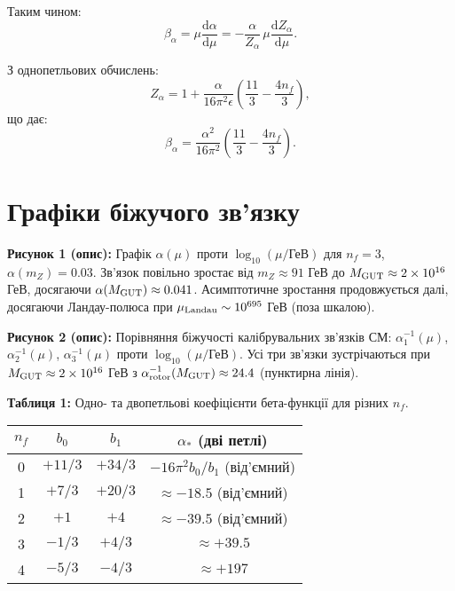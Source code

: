 \documentclass[11pt,a4paper]{article}
\numberwithin{equation}{section}
\theoremstyle{plain}
\theoremstyle{definition}
\theoremstyle{remark}
\newcommand{\dd}{\mathrm{d}}
\begin{document}
Таким чином:
\begin{equation}
\beta_\alpha = \mu\frac{\dd\alpha}{\dd\mu} = -\frac{\alpha}{Z_\alpha}\,\mu\frac{\dd Z_\alpha}{\dd\mu}.
\label{eq:beta-from-Z}
\end{equation}

З однопетльових обчислень:
\begin{equation}
Z_\alpha = 1 + \frac{\alpha}{16\pi^2\epsilon}\left(\frac{11}{3}-\frac{4n_f}{3}\right),
\label{eq:Z-alpha-1loop}
\end{equation}
що дає:
\begin{equation}
\beta_\alpha = \frac{\alpha^2}{16\pi^2}\left(\frac{11}{3}-\frac{4n_f}{3}\right).
\label{eq:beta-final}
\end{equation}

\section{Графіки біжучого зв'язку}\label{app:plots}

\textbf{Рисунок 1 (опис):} Графік $\alpha(\mu)$ проти $\log_{10}(\mu/\text{ГеВ})$ для $n_f=3$, $\alpha(m_Z)=0{.}03$. Зв'язок повільно зростає від $m_Z\approx 91$ ГеВ до $M_{\rm GUT}\approx 2\times 10^{16}$ ГеВ, досягаючи $\alpha(M_{\rm GUT})\approx 0{.}041$. Асимптотичне зростання продовжується далі, досягаючи Ландау-полюса при $\mu_{\rm Landau}\sim 10^{695}$ ГеВ (поза шкалою).

\textbf{Рисунок 2 (опис):} Порівняння біжучості калібрувальних зв'язків СМ: $\alpha_1^{-1}(\mu)$, $\alpha_2^{-1}(\mu)$, $\alpha_3^{-1}(\mu)$ проти $\log_{10}(\mu/\text{ГеВ})$. Усі три зв'язки зустрічаються при $M_{\rm GUT}\approx 2\times 10^{16}$ ГеВ з $\alpha_{\rm rotor}^{-1}(M_{\rm GUT})\approx 24{.}4$ (пунктирна лінія).

\textbf{Таблиця 1:} Одно- та двопетльові коефіцієнти бета-функції для різних $n_f$.

\begin{center}
\begin{tabular}{cccc}
\toprule
$n_f$ & $b_0$ & $b_1$ & $\alpha_*$ (дві петлі) \\
\midrule
0 & $+11/3$ & $+34/3$ & $-16\pi^2 b_0/b_1$ (від'ємний) \\
1 & $+7/3$ & $+20/3$ & $\approx -18{.}5$ (від'ємний) \\
2 & $+1$ & $+4$ & $\approx -39{.}5$ (від'ємний) \\
3 & $-1/3$ & $+4/3$ & $\approx +39{.}5$ \\
4 & $-5/3$ & $-4/3$ & $\approx +197$ \\
\bottomrule
\end{tabular}
\end{center}
\end{document}
